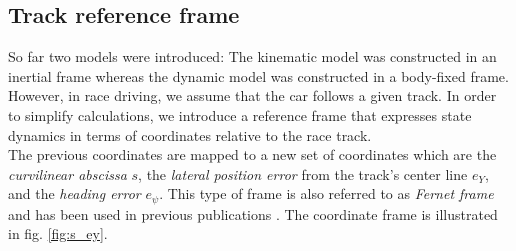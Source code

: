 \subsection{Track reference frame}
So far two models were introduced: The kinematic model was constructed in an inertial frame whereas the dynamic model was constructed in a body-fixed frame. However, in race driving, we assume that the car follows a given track. In order to simplify calculations, we introduce a reference frame that expresses state dynamics in terms of coordinates relative to the race track.\\
The previous coordinates are mapped to a new set of coordinates which are the \emph{curvilinear abscissa} $s$, the \emph{lateral position error} from the track's center line $e_Y$, and the \emph{heading error} $e_\psi$. This type of frame is also referred to as \emph{Fernet frame} and has been used in previous publications \cite{Micaelli2006}. The coordinate frame is illustrated in fig. \ref{fig:s_ey}.

